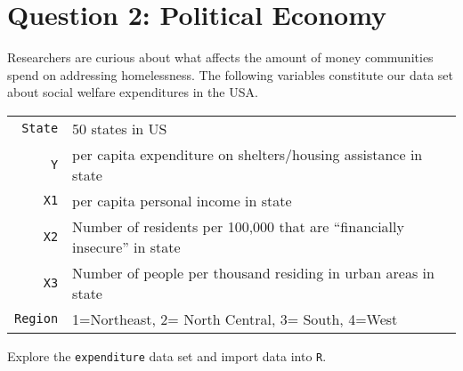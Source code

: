 \documentclass[12pt,letterpaper]{article}
\begin{document}
	\newpage
	
	\section*{Question 2: Political Economy}
	
	\noindent Researchers are curious about what affects the amount of money communities spend on addressing homelessness. The following variables constitute our data set about social welfare expenditures in the USA.
	
	\vspace{.5cm}
	
	\begin{tabular}{r|l}
		\texttt{State} & 50 states in US \\
		\texttt{Y} & per capita expenditure on shelters/housing assistance in state\\
		\texttt{X1} & per capita personal income in state \\
		\texttt{X2} & Number of residents per 100,000 that are ``financially insecure'' in state\\
		\texttt{X3} & Number of people per thousand residing in urban areas in state \\
		\texttt{Region} & 1=Northeast, 2= North Central, 3= South, 4=West \\
	\end{tabular}
	
	\vspace{.5cm}
	\noindent Explore the \texttt{expenditure} data set and import data into \texttt{R}.
	
	\vspace{.5cm}
	
\end{document}
